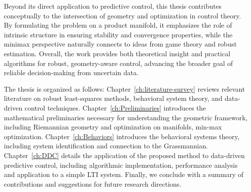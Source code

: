 {        Beyond its direct application to predictive control, this thesis contributes conceptually to the intersection of geometry and optimization in control theory. By formulating the problem on a product manifold, it emphasizes the role of intrinsic structure in ensuring stability and convergence properties, while the minimax perspective naturally connects to ideas from game theory and robust estimation. Overall, the work provides both theoretical insight and practical algorithms for robust, geometry-aware control, advancing the broader goal of reliable decision-making from uncertain data.

        The thesis is organized as follows: Chapter~\ref{ch:literature-survey} reviews relevant literature on robust least-squares methods, behavioral system theory, and data-driven control techniques. Chapter~\ref{ch:Preliminaries} introduces the mathematical preliminaries necessary for understanding the geometric framework, including Riemannian geometry and optimization on manifolds, min-max optimization. Chapter~\ref{ch:Behaviors} introduces the behavioral systems theory, including system identification and connection to the Grassmannian. Chapter~\ref{ch:DDC} details the application of the proposed method to data-driven predictive control, including algorithmic implementation, performance analysis and application to a simple LTI system. Finally, we conclude with a summary of contributions and suggestions for future research directions.
}

\newcommand*{\Subject}{%
    Robust Least-Squares Optimization for Data-Driven Predictive Control
}

\newcommand*{\Keywords}{%
    \textcolor{red}{Least-Squares, Data-Driven, Predictive Control, Robust Optimization}
}
\newcommand*{\KeywordsPlaintext}{%
    Least-Squares, Data-Driven, Predictive Control, Robust Optimization
}
